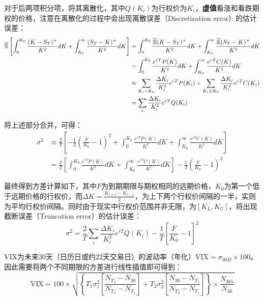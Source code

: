 \documentclass[11pt]{article}
\begin{document}
对于后两项积分项，将其离散化，其中$Q(K_i)$为行权价为$K_i$，\textbf{虚值}看涨和看跌期权的价格，注意在离散化的过程中会出现离散误差（Discretization error）的估计误差：
\begin{align*}
    \widetilde{\mathbb{E}} \left[ \int^{K_0}_{0} \frac{(K-S_T)^+}{K^2} dK + \int^{\infty}_{K_0} \frac{(S_T-K)^+}{K^2} dK \right]
    &= \int^{K_0}_{0} \frac{\widetilde{\mathbb{E}}(K-S_T)^+ }{K^2} dK + \int^{\infty}_{K_0} \frac{\widetilde{\mathbb{E}}(S_T-K)^+}{K^2} dK \\
    &= \int^{K_0}_{0} \frac{e^{rT}P(K)}{K^2} dK + \int^{\infty}_{K_0} \frac{e^{rT}C(K)}{K^2} dK \\
    &\approx \sum_{K_i < K_0} \frac{\Delta K_i}{K_i^2} e^{rT} P(K_i) + \sum_{K_i \geq K_0} \frac{\Delta K_i}{K_i^2} e^{rT} C(K_i) \\
    &= \sum_{i} \frac{\Delta K_i}{K_i^2} e^{rT} Q(K_i)
\end{align*}

将上述部分合并，可得：
\begin{align*}
    \sigma^2 &\approx \frac{2}{T} \left[ - \frac{1}{2} \left( \frac{F}{K_0} -1 \right)^2 + \int^{K_0}_{0} \frac{e^{rT}P(K)}{K^2} dK + \int^{\infty}_{K_0} \frac{e^{rT}C(K)}{K^2} dK \right] \\
    &= \frac{2}{T} \left[ \int^{K_0}_{0} \frac{e^{rT}P(K)}{K^2} dK + \int^{\infty}_{K_0} \frac{e^{rT}C(K)}{K^2} dK \right] - \frac{1}{T} \left( \frac{F}{K_0} -1 \right)^2
\end{align*}

最终得到方差计算如下，其中$F$为到期期限与期权相同的远期价格，$K_0$为第一个低于远期价格的行权价，而$\Delta K = \tfrac{K_{i+1}-K_{i-1}}{2}$，为上下两个行权价间隔的一半，实则为平均行权价间隔。同时由于现实中行权价范围并非无限，为$[K_L,K_U]$，将出现截断误差（Truncation error）的估计误差：
\begin{equation*}
    \boxed{
        \sigma^2 = \frac{2}{T} \sum_{i} \frac{\Delta K_i}{K_i^2} e^{rT} Q(K_i) - \frac{1}{T} \left[\frac{F}{K_0} - 1\right]^2 
    }
\end{equation*}

VIX为未来30天（日历日或约22天交易日）的波动率（年化）$\text{VIX}=\sigma_{30D} \times 100$。因此需要将两个不同期限的方差进行线性插值即可得到：
\begin{equation*}
    \text{VIX} = 100 \times \sqrt{ \left\{ T_1 \sigma^2_1 \left[ \frac{N_{T_2} - N_{30}}{N_{T_2}-N_{T_1}}\right] + T_2 \sigma^2_2 \left[ \frac{N_{30} - N_{T_1}}{N_{T_2}-N_{T_1}}\right] \right\}\times \frac{N_{365}}{N_{30}} }
\end{equation*}
\end{document}
